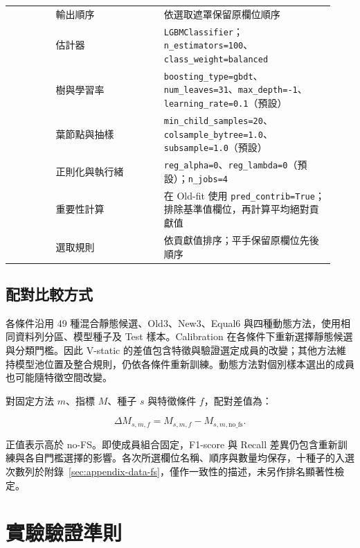 \begin{longtable}{@{}>{\raggedright\arraybackslash}p{0.13\linewidth}>{\raggedright\arraybackslash}p{0.31\linewidth}>{\raggedright\arraybackslash}p{0.49\linewidth}@{}}
 & 輸出順序 & 依選取遮罩保留原欄位順序 \\
\multirow[t]{6}{=}{SHAP 排序} & 估計器 & \nolinkurl{LGBMClassifier}；\nolinkurl{n_estimators=100}、\nolinkurl{class_weight=balanced} \\*
 & 樹與學習率 & \nolinkurl{boosting_type=gbdt}、\nolinkurl{num_leaves=31}、\nolinkurl{max_depth=-1}、\nolinkurl{learning_rate=0.1}（預設） \\*
 & 葉節點與抽樣 & \nolinkurl{min_child_samples=20}、\nolinkurl{colsample_bytree=1.0}、\nolinkurl{subsample=1.0}（預設） \\*
 & 正則化與執行緒 & \nolinkurl{reg_alpha=0}、\nolinkurl{reg_lambda=0}（預設）；\nolinkurl{n_jobs=4} \\*
 & 重要性計算 & 在 Old-fit 使用 \nolinkurl{pred_contrib=True}；排除基準值欄位，再計算平均絕對貢獻值 \\*
 & 選取規則 & 依貢獻值排序；平手保留原欄位先後順序 \\
\end{longtable}
\endgroup

\subsection{配對比較方式}

各條件沿用 49 種混合靜態候選、Old3、New3、Equal6 與四種動態方法，使用相同資料列分區、模型種子及 Test 樣本。Calibration 在各條件下重新選擇靜態候選與分類門檻。因此 V-static 的差值包含特徵與驗證選定成員的改變；其他方法維持模型池位置及整合規則，仍依各條件重新訓練。動態方法對個別樣本選出的成員也可能隨特徵空間改變。

對固定方法 \(m\)、指標 \(M\)、種子 \(s\) 與特徵條件 \(f\)，配對差值為：

\begin{equation}\label{eq:method-delta}
\Delta M_{s,m,f}=M_{s,m,f}-M_{s,m,\mathrm{no\_fs}}.
\end{equation}

正值表示高於 no-FS。即使成員組合固定，F1-score 與 Recall 差異仍包含重新訓練與各自門檻選擇的影響。各次所選欄位名稱、順序與數量均保存，十種子的入選次數列於附錄~\ref{sec:appendix-data-fs}，僅作一致性的描述，未另作排名顯著性檢定。

\clearpage
\section{實驗驗證準則}\label{sec:method-validation}


